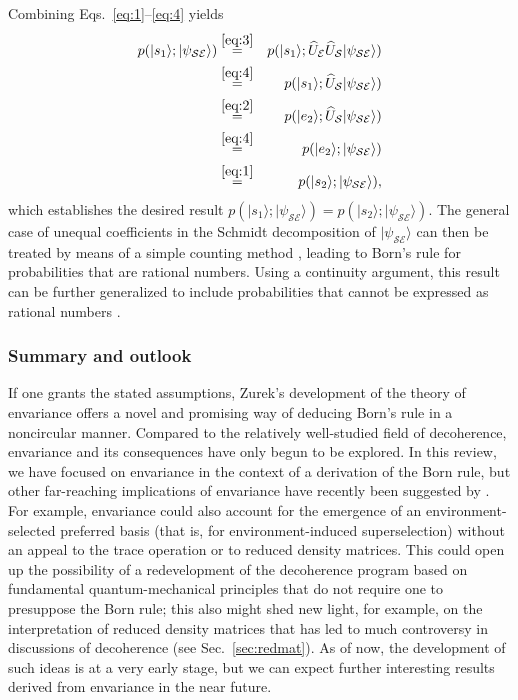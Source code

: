 \documentclass[rmp,aps,amsmath,amsfonts,noshowkeys,noshowpacs,12pt]{revtex4}
\newcommand{\ket}[1]{\ensuremath{|{#1\rangle}}}
\begin{document}
%
Combining Eqs.~\eqref{eq:1}--\eqref{eq:4} yields
%
\begin{eqnarray}
  p(\ket{s_1}; \ket{\psi_\mathcal{SE}}) &\stackrel{\eqref{eq:3}}{=}& p(\ket{s_1};
  \widehat{U}_\mathcal{E} \widehat{U}_\mathcal{S}
  \ket{\psi_\mathcal{SE}}) \nonumber \\ &\stackrel{\eqref{eq:4}}{=}&
  p(\ket{s_1}; \widehat{U}_\mathcal{S} 
  \ket{\psi_\mathcal{SE}}) \nonumber \\ &\stackrel{\eqref{eq:2}}{=}&
  p(\ket{e_2}; \widehat{U}_\mathcal{S} 
  \ket{\psi_\mathcal{SE}})  \nonumber \\ &\stackrel{\eqref{eq:4}}{=}& p(\ket{e_2};
  \ket{\psi_\mathcal{SE}})  \nonumber \\ &\stackrel{\eqref{eq:1}}{=} &
  p(\ket{s_2}; \ket{\psi_\mathcal{SE}}),
\end{eqnarray}
%
which establishes the desired result $p(\ket{s_1};
\ket{\psi_\mathcal{SE}})=p(\ket{s_2}; \ket{\psi_\mathcal{SE}})$.  The
general case of unequal coefficients in the Schmidt decomposition of
$\ket{\psi_\mathcal{SE}}$ can then be treated by means of a simple
counting method \citep{Zurek:2003:rv,Zurek:2004:yb}, leading to Born's
rule for probabilities that are rational numbers. Using a continuity
argument, this result can be further generalized to include
probabilities that cannot be expressed as rational numbers
\citep{Zurek:2004:yb}.

\subsubsection{Summary and outlook}

If one grants the stated assumptions, Zurek's development of the
theory of envariance offers a novel and promising way of deducing
Born's rule in a noncircular manner.  Compared to the relatively
well-studied field of decoherence, envariance and its consequences
have only begun to be explored. In this review, we have focused on
envariance in the context of a derivation of the Born rule, but other
far-reaching implications of envariance have recently been suggested
by \citet{Zurek:2004:yb}.  For example, envariance could also account
for the emergence of an environment-selected preferred basis (that is,
for environment-induced superselection) without an appeal to the trace
operation or to reduced density matrices. This could open up the
possibility of a redevelopment of the decoherence program based on
fundamental quantum-mechanical principles that do not require one to
presuppose the Born rule; this also might shed new light, for example,
on the interpretation of reduced density matrices that has led to much
controversy in discussions of decoherence (see Sec.~\ref{sec:redmat}).
As of now, the development of such ideas is at a very early stage, but
we can expect further interesting results derived from envariance in
the near future.
\end{document}
